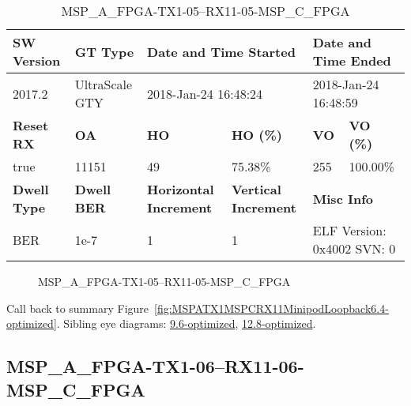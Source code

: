 \begin{table}[h]
\centering
\caption{MSP\_A\_FPGA-TX1-05--RX11-05-MSP\_C\_FPGA}
\label{tab:MSPAFPGATX105RX1105MSPCFPGA6.4-optimized}
\begin{tabular}{@{}|l|l|l|l|l|l|@{}}
\toprule
\textbf{SW Version}                & \textbf{GT Type}   & \multicolumn{2}{l|}{\textbf{Date and Time Started}}            & \multicolumn{2}{l|}{\textbf{Date and Time Ended}}        \\ \midrule
2017.2                       & UltraScale GTY          & \multicolumn{2}{l|}{2018-Jan-24 16:48:24}                   & \multicolumn{2}{l|}{2018-Jan-24 16:48:59}               \\ \midrule
\textbf{Reset RX}                  & \textbf{OA} & \textbf{HO}   & \textbf{HO (\%)} & \textbf{VO} & \textbf{VO (\%)} \\ \midrule
true & 11151        & 49          & 75.38\%        & 255        & 100.00\%       \\ \midrule
\textbf{Dwell Type}                & \textbf{Dwell BER} & \textbf{Horizontal Increment} & \textbf{Vertical Increment}    & \multicolumn{2}{l|}{\textbf{Misc Info}}                  \\ \midrule
BER                            & 1e-7        & 1        & 1           & \multicolumn{2}{l|}{ELF Version: 0x4002 SVN: 0}                         \\ \bottomrule
\end{tabular}
\end{table}

\begin{figure}[h]
\caption{MSP\_A\_FPGA-TX1-05--RX11-05-MSP\_C\_FPGA} \label{fig:MSPAFPGATX105RX1105MSPCFPGA6.4-optimized}
\end{figure}

Call back to summary Figure~\ref{fig:MSPATX1MSPCRX11MinipodLoopback6.4-optimized}.
Sibling eye diagrams: \hyperref[sec:MSPAFPGATX105RX1105MSPCFPGA9.6-optimized]{9.6-optimized}, \hyperref[sec:MSPAFPGATX105RX1105MSPCFPGA12.8-optimized]{12.8-optimized}.

\clearpage
\newpage


\subsection{MSP\_A\_FPGA-TX1-06--RX11-06-MSP\_C\_FPGA}\label{sec:MSPAFPGATX106RX1106MSPCFPGA6.4-optimized}


